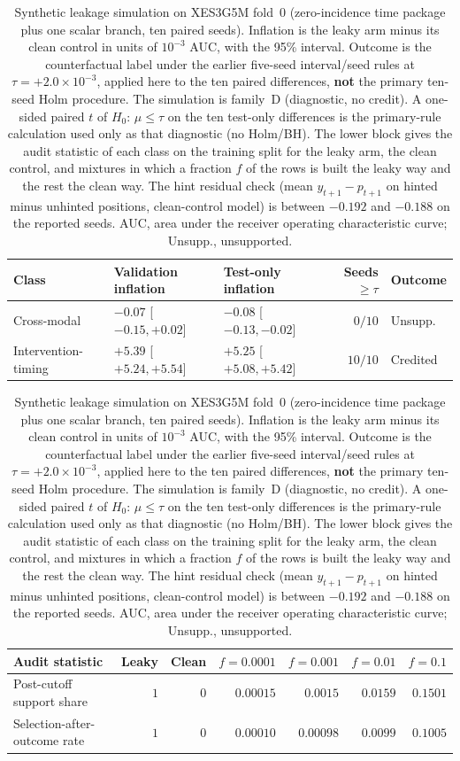 \begin{table}[H]
\caption{Synthetic leakage simulation on XES3G5M fold~0 (zero-incidence
time package plus one scalar branch, ten paired seeds). Inflation is
the leaky arm minus its clean control in units of $10^{-3}$ AUC, with the
95\% interval. Outcome is the counterfactual label under the earlier five-seed
interval/seed rules at $\tau={+}2.0\times 10^{-3}$, applied here to the
ten paired differences, \textbf{not} the primary ten-seed Holm
procedure. The simulation is family~D (diagnostic, no credit). A
one-sided paired $t$ of $H_0{:}\,\mu\le\tau$ on the ten test-only
differences is the primary-rule calculation used only as that
diagnostic (no Holm/BH). The lower block gives the audit statistic
of each class on the training split for the leaky arm, the clean
control, and mixtures in which a fraction $f$ of the rows is built the
leaky way and the rest the clean way. The hint residual check
(mean $y_{t+1}-p_{t+1}$ on hinted minus unhinted positions, clean-control
model) is between $-0.192$ and $-0.188$ on the reported seeds.
AUC, area under the receiver operating characteristic curve; Unsupp.,
unsupported.}
\label{tab:leak-simulation}
\centering
\scriptsize
\setlength{\tabcolsep}{3pt}
\begin{tabular}{@{}lllrl@{}}
\toprule
Class & Validation inflation & Test-only inflation & Seeds $\ge\tau$ & Outcome \\
\midrule
Cross-modal & $-0.07$ [$-0.15, +0.02$] & $-0.08$ [$-0.13, -0.02$] & $0/10$ & Unsupp. \\
Intervention-timing & $+5.39$ [$+5.24, +5.54$] & $+5.25$ [$+5.08, +5.42$] & $10/10$ & Credited \\
\bottomrule
\end{tabular}

\medskip
\begin{tabular}{@{}lrrrrrr@{}}
\toprule
Audit statistic & Leaky & Clean & $f=0.0001$ & $f=0.001$ & $f=0.01$ & $f=0.1$ \\
\midrule
Post-cutoff support share & $1$ & $0$ & $0.00015$ & $0.0015$ & $0.0159$ & $0.1501$ \\
Selection-after-outcome rate & $1$ & $0$ & $0.00010$ & $0.00098$ & $0.0099$ & $0.1005$ \\
\bottomrule
\end{tabular}
\end{table}
